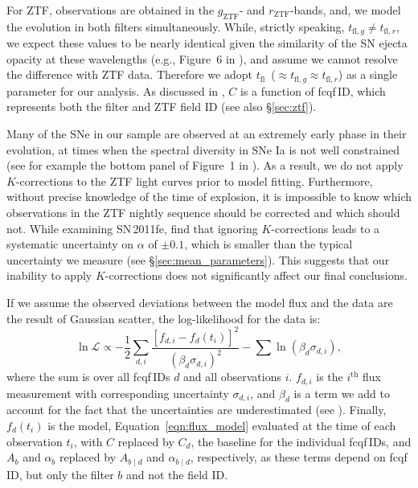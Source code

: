 \documentclass[twocolumn]{aastex63}
\newcommand{\rztf}{$r_\mathrm{ZTF}$}
\newcommand{\gztf}{$g_\mathrm{ZTF}$}
\newcommand{\tfl}{$t_\mathrm{fl}$}
\begin{document}
For ZTF, observations are obtained in the \gztf- and \rztf-bands, and, we
model the evolution in both filters simultaneously. While, strictly speaking,
$t_{\mathrm{fl}, g} \ne t_{\mathrm{fl}, r}$, we expect these values to be
nearly identical given the similarity of the SN ejecta opacity at these
wavelengths (e.g., Figure~6 in \citealt{Magee18}), and assume we cannot
resolve the difference with ZTF data. Therefore we adopt \tfl\ ($\approx
t_{\mathrm{fl}, g} \approx t_{\mathrm{fl}, r}$) as a single parameter for our
analysis. As discussed in \citet{Yao19}, $C$ is a function of fcqf\,ID, which
represents both the filter and ZTF field ID (see also \S\ref{sec:ztf}).

Many of the SNe in our sample are observed at an extremely early phase in
their evolution, at times when the spectral diversity in SNe Ia is not well
constrained (see for example the bottom panel of Figure~1 in \citealt{Guy07}).
As a result, we do not apply $K$-corrections to the ZTF light curves prior to
model fitting. Furthermore, without precise knowledge of the time of
explosion, it is impossible to know which observations in the ZTF nightly
sequence should be corrected and which should not. While examining SN\,2011fe,
\citet{Firth15} find that ignoring $K$-corrections leads to a systematic
uncertainty on $\alpha$ of $\pm0.1$, which is smaller than the typical
uncertainty we measure (see \S\ref{sec:mean_parameters}). This suggests that
our inability to apply $K$-corrections does not significantly affect our final
conclusions.

If we assume the observed deviations between the model flux and the data are
the result of Gaussian scatter, the log-likelihood for the data is:
%
\begin{equation}
    \ln \mathscr{L} \propto -\frac{1}{2}\sum_{d,i} \frac{[f_{d,i} - f_d(t_i)]^2}{(\beta_d \sigma_{d,i})^2} -\sum{\ln (\beta_d \sigma_{d,i})},
\end{equation}
%
where the sum is over all fcqf\,IDs $d$ and all observations $i$. $f_{d,i}$
is the $i^\mathrm{th}$ flux measurement with corresponding uncertainty
$\sigma_{d,i}$, and $\beta_d$ is a term we add to account for the fact that
the uncertainties are underestimated (see \citealt{Yao19}). Finally,
$f_d(t_i)$ is the model, Equation~\ref{eqn:flux_model} evaluated at the time
of each observation $t_i$, with $C$ replaced by $C_d$, the baseline for the
individual fcqf\,IDs, and $A_b$ and $\alpha_b$ replaced by $A_{b\mid d}$ and
$\alpha_{b\mid d}$, respectively, as these terms depend on fcqf\,ID, but
only the filter $b$ and not the field ID.
\end{document}
